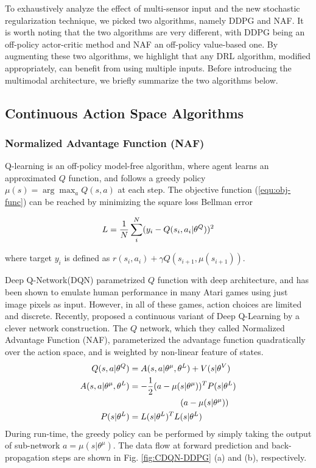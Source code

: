 \documentclass[../thesis.tex]{subfiles}
\begin{document}
To exhaustively analyze the effect of multi-sensor input and the new stochastic regularization technique, we picked two algorithms, namely DDPG and NAF. It is worth noting that the two algorithms are very different, with DDPG being an off-policy actor-critic method and NAF an off-policy value-based one. By augmenting these two algorithms, we highlight that any DRL algorithm, modified appropriately, can benefit from using multiple inputs. Before introducing the multimodal architecture, we briefly summarize the two algorithms below.


\subsection{Continuous Action Space Algorithms}

\subsubsection{Normalized Advantage Function (NAF)} 
\label{sec:CDQN}

Q-learning \cite{sutton1999policy} is an off-policy model-free algorithm, where agent learns an approximated $Q$ function, and follows a greedy policy $\mu(s)=\arg\max_aQ(s,a)$ at each step. The objective function (\ref{equ:obj-func}) can be reached by minimizing the square loss Bellman error

\begin{align}
\centering
L = \frac{1}{N} \sum_i^N (y_i-Q(s_i,a_i|\theta^Q))^2
\end{align}

where target $y_i$ is defined as $r(s_i,a_i) + \gamma Q(s_{i+1},\mu(s_{i+1}))$.


Deep Q-Network(DQN) parametrized $Q$ function with deep architecture\cite{mnih2013playing}, and has been shown to emulate human performance \cite{mnih2015human} in many Atari games using just image pixels as input. However, in all of these games, action choices are limited and discrete. Recently, \citet{CDQN} proposed a continuous variant of Deep Q-Learning by a clever network construction. The $Q$ network, which they called Normalized Advantage Function (NAF), parameterized the advantage function quadratically over the action space, and is weighted by non-linear feature of states. 
\begin{align}
\centering
Q(s,a|\theta^Q) &= A(s,a | \theta^\mu, \theta^L) + V(s|\theta^V) \\
A(s,a | \theta^\mu, \theta^L) &= -\frac{1}{2}(a-\mu(s|\theta^\mu))^T P(s|\theta^L)\nonumber \\
&\qquad \qquad \qquad(a-\mu(s|\theta^\mu)) \label{equ:NAF} \\
P(s|\theta^L) &= L(s|\theta^L)^TL(s|\theta^L) \label{equ:P}
\end{align}
During run-time, the greedy policy can be performed by simply taking the output of sub-network $a = \mu(s|\theta^\mu)$. The data flow at forward prediction and back-propagation steps are shown in Fig. \ref{fig:CDQN-DDPG} (a) and (b), respectively.
\end{document}
